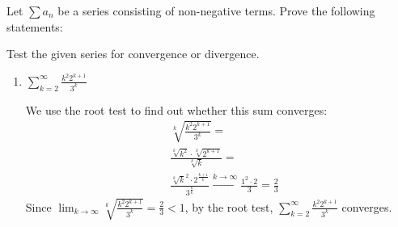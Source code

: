 \documentclass[week=6]{homework}
\begin{document}
\begin{questions}
    
	    \question
	    Let $\sum a_n$ be a series consisting of non-negative terms. Prove the following statements:
    
	    \question
	    Test the given series for convergence or divergence.
	    \begin{enumerate}[label=(\alph*)]
	    	\item $\displaystyle \sum_{k=2}^{\infty} \frac{k^2 2^{k+1}}{3^k}$
	    	
	    	We use the root test to find out whether this sum converges:
	    	\begin{align*}
		    	& \sqrt[k]{\frac{k^2 2^{k+1}}{3^k}} = \\
		    	& \frac{\sqrt[k]{k^2} \cdot \sqrt[k]{2^{k+1}}}{\sqrt[k]{k}} = \\
			    & \frac{\sqrt[k]{k}^2 \cdot 2^{\frac{k+1}{k}}}{3^{\frac{k}{k}}} \xrightarrow{k \to \infty} \frac{1^2 \cdot 2}{3} = \frac{2}{3}
	    	\end{align*}
	    	Since $\lim_{k \to \infty} \sqrt[k]{\frac{k^2 2^{k+1}}{3^k}} = \frac{2}{3} < 1$, by the root test, $\sum_{k=2}^{\infty} \frac{k^2 2^{k+1}}{3^k}$ converges. 
	    	

\end{enumerate}
\end{questions}
\end{document}
